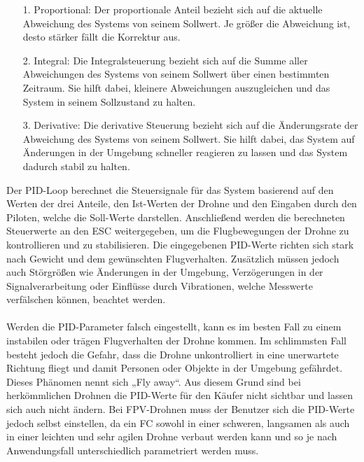             \begin{itemize}
                \item[1.] Proportional: Der proportionale Anteil bezieht sich auf die aktuelle Abweichung des Systems von seinem Sollwert. Je größer die Abweichung ist, desto stärker fällt die Korrektur aus.
                \item[2.] Integral: Die Integralsteuerung bezieht sich auf die Summe aller Abweichungen des Systems von seinem Sollwert über einen bestimmten Zeitraum. Sie hilft dabei, kleinere Abweichungen auszugleichen und das System in seinem Sollzustand zu halten.
                \item[3.] Derivative: Die derivative Steuerung bezieht sich auf die Änderungsrate der Abweichung des Systems von seinem Sollwert. Sie hilft dabei, das System auf Änderungen in der Umgebung schneller reagieren zu lassen und das System dadurch stabil zu halten.
            \end{itemize}

            Der PID-Loop berechnet die Steuersignale für das System basierend auf den Werten der drei
            Anteile, den Ist-Werten der Drohne und den Eingaben durch den Piloten, welche die Soll-Werte
            darstellen. Anschließend werden die berechneten Steuerwerte an den ESC weitergegeben, um
            die Flugbewegungen der Drohne zu kontrollieren und zu stabilisieren. Die eingegebenen PID-Werte
            richten sich stark nach Gewicht und dem gewünschten Flugverhalten. Zusätzlich müssen jedoch
            auch Störgrößen wie Änderungen in der Umgebung, Verzögerungen in der Signalverarbeitung oder
            Einflüsse durch Vibrationen, welche Messwerte verfälschen können, beachtet werden. \\
            \\
            Werden die PID-Parameter falsch eingestellt, kann es im besten Fall zu einem instabilen oder
            trägen Flugverhalten der Drohne kommen. Im schlimmsten Fall besteht jedoch die Gefahr, dass
            die Drohne unkontrolliert in eine unerwartete Richtung fliegt und damit Personen oder Objekte
            in der Umgebung gefährdet. Dieses Phänomen nennt sich „Fly away“. Aus diesem Grund sind bei
            herkömmlichen Drohnen die PID-Werte für den Käufer nicht sichtbar und lassen sich auch nicht
            ändern. Bei FPV-Drohnen muss der Benutzer sich die PID-Werte jedoch selbst einstellen, da ein FC sowohl
            in einer schweren, langsamen als auch in einer leichten und sehr agilen Drohne verbaut werden
            kann und so je nach Anwendungsfall unterschiedlich parametriert werden muss.
        
